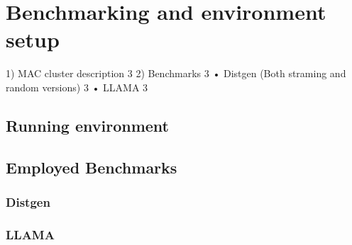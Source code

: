 \chapter{Benchmarking and environment setup}\label{chapter:envsetup}

1)	MAC cluster description	3
2)	Benchmarks	3
•	Distgen (Both straming and random versions)	3
•	LLAMA	3


\section{Running environment}\label{section:runningenv}


\section{Employed Benchmarks}\label{section:emplybmchs}

\subsection{Distgen}\label{section:distgen}

\subsection{LLAMA}\label{section:Lama}